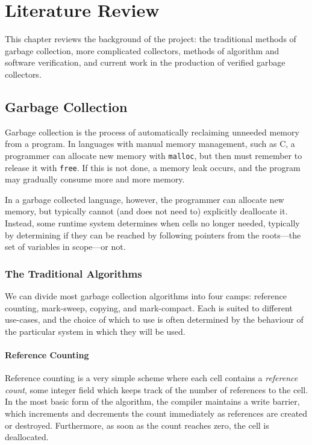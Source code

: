 \chapter{Literature Review}


This chapter reviews the background of the project: the traditional
methods of garbage collection, more complicated collectors, methods of
algorithm and software verification, and current work in the
production of verified garbage collectors.

\section{Garbage Collection}

Garbage collection is the process of automatically reclaiming unneeded
memory from a program. In languages with manual memory management,
such as C, a programmer can allocate new memory with \texttt{malloc},
but then must remember to release it with \texttt{free}. If this is
not done, a memory leak occurs, and the program may gradually consume
more and more memory.

In a garbage collected language, however, the programmer can allocate
new memory, but typically cannot (and does not need to) explicitly
deallocate it. Instead, some runtime system determines when
\glspl{cell} no longer needed, typically by determining if they can be
reached by following pointers from the \glspl{root}---the set of
variables in scope---or not.

\subsection{The Traditional Algorithms}

We can divide most garbage collection algorithms into four camps:
\gls{reference counting}, \gls{mark-sweep}, \gls{copying}, and
\gls{mark-compact}. Each is suited to different use-cases, and the
choice of which to use is often determined by the behaviour of the
particular system in which they will be used.

\subsubsection{Reference Counting}

Reference counting is a very simple scheme where each \gls{cell}
contains a \textit{reference count}, some integer field which keeps
track of the number of references to the \gls{cell}. In the most basic
form of the algorithm, the compiler maintains a write barrier, which
increments and decrements the count immediately as references are
created or destroyed. Furthermore, as soon as the count reaches zero,
the \gls{cell} is deallocated\cite{Collins60}.

